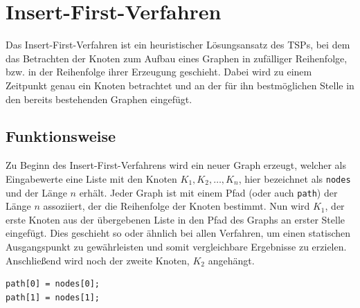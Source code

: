 \section{Insert-First-Verfahren} \label{sec:insert-first-verfahren}

Das Insert-First-Verfahren ist ein heuristischer Lösungsansatz des \ac{TSP}s, bei dem das Betrachten der Knoten zum Aufbau eines Graphen in zufälliger Reihenfolge, bzw. in der Reihenfolge ihrer Erzeugung geschieht.
Dabei wird zu einem Zeitpunkt genau ein Knoten betrachtet und an der für ihn bestmöglichen Stelle in den bereits bestehenden Graphen eingefügt.

\subsection{Funktionsweise}
Zu Beginn des Insert-First-Verfahrens wird ein neuer Graph erzeugt, welcher als Eingabewerte eine Liste mit den Knoten $K_1, K_2,  \ldots ,K_n$, hier bezeichnet als \lstinline{nodes} und der Länge $n$ erhält. 
Jeder Graph ist mit einem Pfad (oder auch \lstinline{path}) der Länge $n$ assoziiert, der die Reihenfolge der Knoten bestimmt. 
Nun wird $K_1$, der erste Knoten aus der übergebenen Liste in den Pfad des Graphs an erster Stelle eingefügt. 
Dies geschieht so oder ähnlich bei allen Verfahren, um einen statischen Ausgangspunkt zu gewährleisten und somit vergleichbare Ergebnisse zu erzielen.
Anschließend wird noch der zweite Knoten, $K_2$ angehängt.

\begin{lstlisting}[caption={Zuweisung des ersten und zweiten Knotens}]
path[0] = nodes[0];
path[1] = nodes[1];  
\end{lstlisting}

